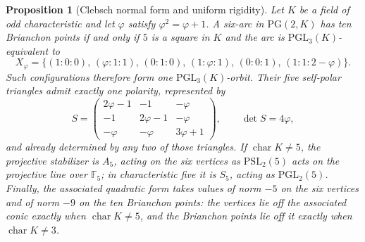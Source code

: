 \documentclass[11pt]{article}
\newtheorem{proposition}[theorem]{Proposition}
\theoremstyle{definition}
\theoremstyle{remark}
\newcommand{\PG}{\mathrm{PG}}
\newcommand{\F}{\mathbb{F}}
\newcommand{\A}{A_5}
\begin{document}
\begin{proposition}[Clebsch normal form and uniform rigidity]
\label{prop:clebsch-normal-form}
Let $K$ be a field of odd characteristic and let $\varphi$ satisfy
$\varphi^2=\varphi+1$. A six-arc in $\PG(2,K)$ has ten Brianchon points if
and only if $5$ is a square in $K$ and the arc is
$\mathrm{PGL}_3(K)$-equivalent to
\[
 X_\varphi=\{(1{:}0{:}0),\,(\varphi{:}1{:}1),\,(0{:}1{:}0),\,
             (1{:}\varphi{:}1),\,(0{:}0{:}1),\,(1{:}1{:}2-\varphi)\}.
\]
Such configurations therefore form one $\mathrm{PGL}_3(K)$-orbit.  Their
five self-polar triangles admit exactly one polarity, represented by
\[
 S=\begin{pmatrix}2\varphi-1&-1&-\varphi\\
                  -1&2\varphi-1&-\varphi\\
                  -\varphi&-\varphi&3\varphi+1\end{pmatrix},
 \qquad\det S=4\varphi,
\]
and already determined by any two of those triangles.  If
$\operatorname{char}K\ne5$, the projective stabilizer is $\A$, acting on
the six vertices as $\mathrm{PSL}_2(5)$ acts on the projective line over
$\F_5$; in characteristic five it is $S_5$, acting as
$\mathrm{PGL}_2(5)$.  Finally, the associated quadratic form
takes values of norm $-5$ on the six vertices and of norm $-9$ on the ten
Brianchon points: the vertices lie off the associated conic exactly when
$\operatorname{char}K\ne5$, and the Brianchon points lie off it exactly when
$\operatorname{char}K\ne3$.
\end{proposition}
\end{document}
